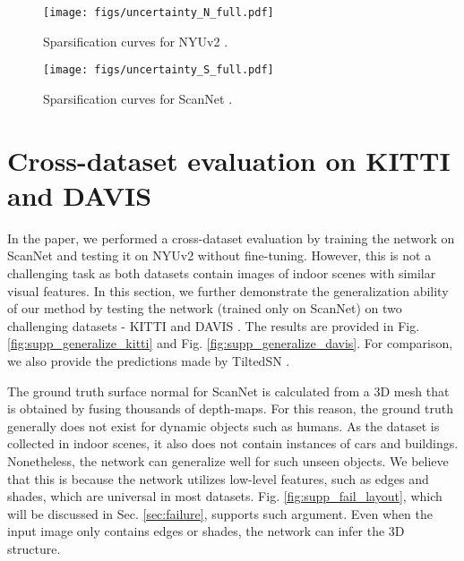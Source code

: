 \documentclass[10pt,twocolumn,letterpaper]{article}
\begin{document}
\begin{figure}[h]
\begin{center}
\texttt{[image: figs/uncertainty\_N\_full.pdf]}
\end{center}
\caption{Sparsification curves for NYUv2 \cite{NYUv2}.}
\label{fig:supp_uncertainty_nyu}
\end{figure}

\begin{figure}[t]
\begin{center}
\texttt{[image: figs/uncertainty\_S\_full.pdf]}
\end{center}
\caption{Sparsification curves for ScanNet \cite{ScanNet}.}
\label{fig:supp_uncertainty_scannet}
\end{figure}

\section{Cross-dataset evaluation on KITTI and DAVIS}
\label{sec:generalization}

In the paper, we performed a cross-dataset evaluation by training the network on ScanNet \cite{ScanNet} and testing it on NYUv2 \cite{NYUv2} without fine-tuning. However, this is not a challenging task as both datasets contain images of indoor scenes with similar visual features. In this section, we further demonstrate the generalization ability of our method by testing the network (trained only on ScanNet) on two challenging datasets - KITTI \cite{KITTI} and DAVIS \cite{DAVIS}. The results are provided in Fig. \ref{fig:supp_generalize_kitti} and Fig. \ref{fig:supp_generalize_davis}. For comparison, we also provide the predictions made by TiltedSN \cite{SNfromRGB_20_TiltedSN}.

The ground truth surface normal for ScanNet is calculated from a 3D mesh that is obtained by fusing thousands of depth-maps. For this reason, the ground truth generally does not exist for dynamic objects such as humans. As the dataset is collected in indoor scenes, it also does not contain instances of cars and buildings. Nonetheless, the network can generalize well for such unseen objects. We believe that this is because the network utilizes low-level features, such as edges and shades, which are universal in most datasets. Fig. \ref{fig:supp_fail_layout}, which will be discussed in Sec. \ref{sec:failure}, supports such argument. Even when the input image only contains edges or shades, the network can infer the 3D structure.
\end{document}
